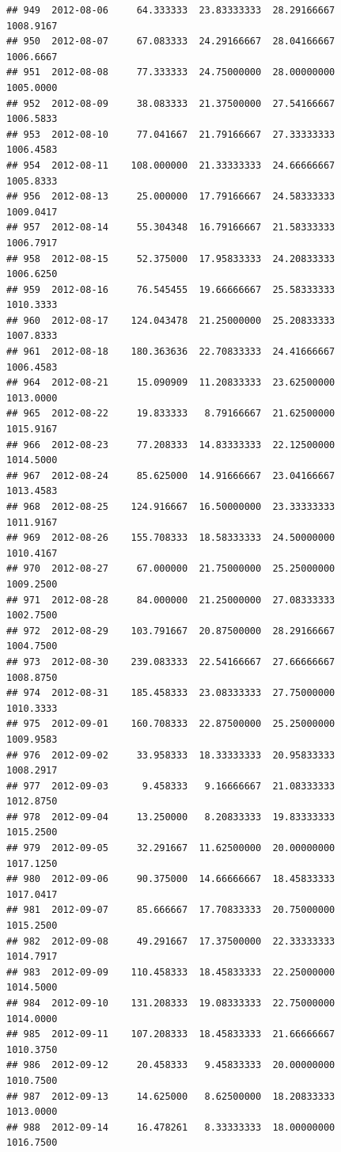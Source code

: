 \documentclass[
]{article}
\begin{document}
\begin{verbatim}
## 949  2012-08-06     64.333333  23.83333333  28.29166667    1008.9167
## 950  2012-08-07     67.083333  24.29166667  28.04166667    1006.6667
## 951  2012-08-08     77.333333  24.75000000  28.00000000    1005.0000
## 952  2012-08-09     38.083333  21.37500000  27.54166667    1006.5833
## 953  2012-08-10     77.041667  21.79166667  27.33333333    1006.4583
## 954  2012-08-11    108.000000  21.33333333  24.66666667    1005.8333
## 956  2012-08-13     25.000000  17.79166667  24.58333333    1009.0417
## 957  2012-08-14     55.304348  16.79166667  21.58333333    1006.7917
## 958  2012-08-15     52.375000  17.95833333  24.20833333    1006.6250
## 959  2012-08-16     76.545455  19.66666667  25.58333333    1010.3333
## 960  2012-08-17    124.043478  21.25000000  25.20833333    1007.8333
## 961  2012-08-18    180.363636  22.70833333  24.41666667    1006.4583
## 964  2012-08-21     15.090909  11.20833333  23.62500000    1013.0000
## 965  2012-08-22     19.833333   8.79166667  21.62500000    1015.9167
## 966  2012-08-23     77.208333  14.83333333  22.12500000    1014.5000
## 967  2012-08-24     85.625000  14.91666667  23.04166667    1013.4583
## 968  2012-08-25    124.916667  16.50000000  23.33333333    1011.9167
## 969  2012-08-26    155.708333  18.58333333  24.50000000    1010.4167
## 970  2012-08-27     67.000000  21.75000000  25.25000000    1009.2500
## 971  2012-08-28     84.000000  21.25000000  27.08333333    1002.7500
## 972  2012-08-29    103.791667  20.87500000  28.29166667    1004.7500
## 973  2012-08-30    239.083333  22.54166667  27.66666667    1008.8750
## 974  2012-08-31    185.458333  23.08333333  27.75000000    1010.3333
## 975  2012-09-01    160.708333  22.87500000  25.25000000    1009.9583
## 976  2012-09-02     33.958333  18.33333333  20.95833333    1008.2917
## 977  2012-09-03      9.458333   9.16666667  21.08333333    1012.8750
## 978  2012-09-04     13.250000   8.20833333  19.83333333    1015.2500
## 979  2012-09-05     32.291667  11.62500000  20.00000000    1017.1250
## 980  2012-09-06     90.375000  14.66666667  18.45833333    1017.0417
## 981  2012-09-07     85.666667  17.70833333  20.75000000    1015.2500
## 982  2012-09-08     49.291667  17.37500000  22.33333333    1014.7917
## 983  2012-09-09    110.458333  18.45833333  22.25000000    1014.5000
## 984  2012-09-10    131.208333  19.08333333  22.75000000    1014.0000
## 985  2012-09-11    107.208333  18.45833333  21.66666667    1010.3750
## 986  2012-09-12     20.458333   9.45833333  20.00000000    1010.7500
## 987  2012-09-13     14.625000   8.62500000  18.20833333    1013.0000
## 988  2012-09-14     16.478261   8.33333333  18.00000000    1016.7500

\end{verbatim}
\end{document}
